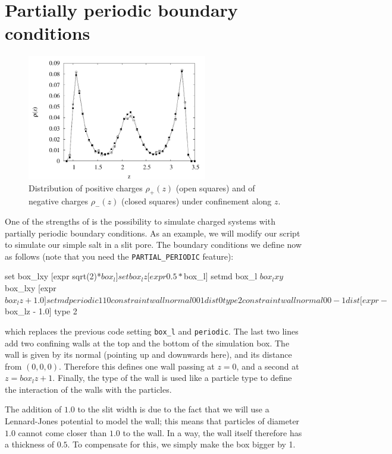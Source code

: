 \documentclass[
a4paper,                        %
11pt,                           %
twoside,                        %
footsepline,                    %
headsepline,                    %
headexclude,                    %
footexclude,                    %
pagesize,                       %
]{scrartcl}
\begin{document}
\section{Partially periodic boundary conditions}

\begin{figure}[t]
  \centering
  \includegraphics[width=0.7\textwidth]{figures/neutral-rho.pdf}
  \caption{Distribution of positive charges $\rho_+(z)$ (open squares)
    and of negative charges $\rho_-(z)$ (closed squares) under
    confinement along $z$.}
  \label{fig:neutralrho}
\end{figure}

One of the strengths of \es{} is the possibility to simulate charged
systems with partially periodic boundary conditions. As an example, we
will modify our script to simulate our simple salt in a slit pore. The
boundary conditions we define now as follows (note that you need the
\verb|PARTIAL_PERIODIC| feature):

\begin{tclcode}
  set box_lxy [expr sqrt(2)*$box_l]
  set box_lz  [expr 0.5*$box_l]
  setmd box_l $box_lxy $box_lxy [expr $box_lz + 1.0]
  setmd periodic 1 1 0
  constraint wall normal 0 0  1 dist 0 type 2
  constraint wall normal 0 0 -1 dist [expr -$box_lz - 1.0] type 2
\end{tclcode}

which replaces the previous code setting \verb|box_l| and
\verb|periodic|. The last two lines add two confining walls at the top
and the bottom of the simulation box. The wall is given by its normal
(pointing up and downwards here), and its distance from
$(0,0,0)$. Therefore this defines one wall passing at $z=0$, and a
second at $z=box_lz+1$. Finally, the type of the wall is used like a
particle type to define the interaction of the walls with the particles.

The addition of $1.0$ to the slit width is due to the fact that we will
use a Lennard-Jones potential to model the wall; this means that
particles of diameter $1.0$ cannot come closer than $1.0$ to the wall. In a
way, the wall itself therefore has a thickness of $0.5$. To compensate
for this, we simply make the box bigger by 1.
\end{document}
